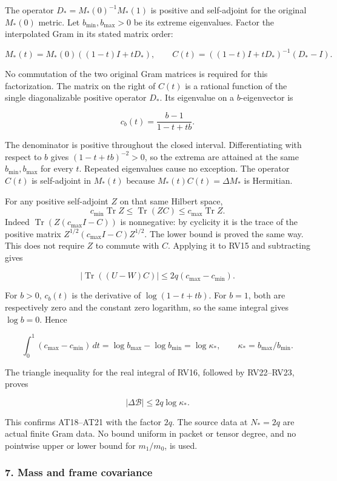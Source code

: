\documentclass{article}
\begin{document}
The operator \(D_*=M_*(0)^{-1}M_*(1)\) is positive and self-adjoint for the original \(M_*(0)\) metric. Let \(b_{\min},b_{\max}>0\) be its extreme eigenvalues. Factor the interpolated Gram in its stated matrix order:

\[
M_*(t)=M_*(0)((1-t)I+tD_*),\qquad
C(t)=((1-t)I+tD_*)^{-1}(D_*-I).
\tag{RV20}
\]

No commutation of the two original Gram matrices is required for this factorization. The matrix on the right of \(C(t)\) is a rational function of the single diagonalizable positive operator \(D_*\). Its eigenvalue on a \(b\)-eigenvector is

\[
c_b(t)=\frac{b-1}{1-t+tb}.
\tag{RV21}
\]

The denominator is positive throughout the closed interval. Differentiating with respect to \(b\) gives \((1-t+tb)^{-2}>0\), so the extrema are attained at the same \(b_{\min},b_{\max}\) for every \(t\). Repeated eigenvalues cause no exception. The operator \(C(t)\) is self-adjoint in \(M_*(t)\) because \(M_*(t)C(t)=\Delta M_*\) is Hermitian.

For any positive self-adjoint \(Z\) on that same Hilbert space, \[
c_{\min}\operatorname{Tr}Z
\le\operatorname{Tr}(ZC)
\le c_{\max}\operatorname{Tr}Z.
\] Indeed \(\operatorname{Tr}(Z(c_{\max}I-C))\) is nonnegative: by cyclicity it is the trace of the positive matrix \(Z^{1/2}(c_{\max}I-C)Z^{1/2}\). The lower bound is proved the same way. This does not require \(Z\) to commute with \(C\). Applying it to RV15 and subtracting gives

\[
|\operatorname{Tr}((U-W)C)|
\le2q(c_{\max}-c_{\min}).
\tag{RV22}
\]

For \(b>0\), \(c_b(t)\) is the derivative of \(\log(1-t+tb)\). For \(b=1\), both are respectively zero and the constant zero logarithm, so the same integral gives \(\log b=0\). Hence

\[
\int_0^1(c_{\max}-c_{\min})\,dt
=\log b_{\max}-\log b_{\min}
=\log\kappa_*,\qquad \kappa_*=b_{\max}/b_{\min}.
\tag{RV23}
\]

The triangle inequality for the real integral of RV16, followed by RV22--RV23, proves

\[
|\Delta\mathcal B|\le2q\log\kappa_*.
\tag{RV24}
\]

This confirms AT18--AT21 with the factor \(2q\). The source data at \(N_*=2q\) are actual finite Gram data. No bound uniform in packet or tensor degree, and no pointwise upper or lower bound for \(m_1/m_0\), is used.

\subsubsection{7. Mass and frame covariance}\label{endpoint-determinant_review--mass-and-frame-covariance}
\end{document}
